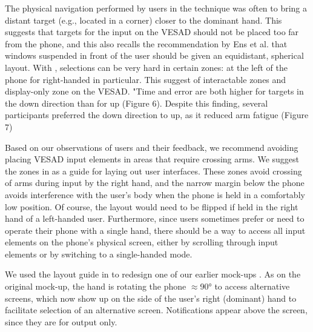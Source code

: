 The physical navigation performed by users in the  technique was often to bring a distant target (e.g., located in a corner) closer to the dominant hand. This suggests that targets for the input on the VESAD should not be placed too far from the phone, and this also recalls the recommendation by Ens et al. \cite{Ens2014} that windows suspended in front of the user should be given an equidistant, spherical layout.
With , selections can be very hard in certain zones: at the left of the phone for right-handed in particular. This suggest of interactable zones and display-only zone on the VESAD.
"Time and error are both higher for targets in the down direction than for up (Figure 6). Despite this finding, several participants preferred the down direction to up, as it reduced arm fatigue (Figure 7) \cite[p. 7]{Ens2014}

Based on our observations of users and their feedback, we recommend avoiding placing VESAD input elements in areas that require crossing arms. We suggest the zones in  as a guide for laying out user interfaces. These zones avoid crossing of arms during input by the right hand, and the narrow margin below the phone avoids interference with the user's body when the phone is held in a comfortably low position. Of course, the layout would need to be flipped if held in the right hand of a left-handed user. Furthermore, since users sometimes prefer or need to operate their phone with a single hand, there should be a way to access all input elements on the phone's physical screen, either by scrolling through input elements or by switching to a single-handed mode.


We used the layout guide in  to redesign one of our earlier mock-ups . As on the original mock-up, the hand is rotating the phone $\approx$\ang{90} to access alternative screens, which now show up on the side of the user's right (dominant) hand to facilitate selection of an alternative screen. Notifications appear above the screen, since they are for output only.


